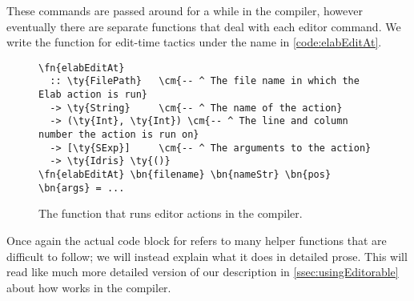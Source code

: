 These commands are passed around for a while in the compiler, however
eventually there are separate functions that deal with each editor command. We
write the function for edit-time tactics under the name  in
\autoref{code:elabEditAt}.

\begin{figure}[ht]
\caption{The function  that runs editor actions in the compiler.}
\label{code:elabEditAt}
\begin{Verbatim}[framesep=2mm, label=\footnotesize{\normalfont{Haskell}}, labelposition=topline]
\fn{elabEditAt}
  :: \ty{FilePath}   \cm{-- ^ The file name in which the Elab action is run}
  -> \ty{String}     \cm{-- ^ The name of the action}
  -> (\ty{Int}, \ty{Int}) \cm{-- ^ The line and column number the action is run on}
  -> [\ty{SExp}]     \cm{-- ^ The arguments to the action}
  -> \ty{Idris} \ty{()}
\fn{elabEditAt} \bn{filename} \bn{nameStr} \bn{pos} \bn{args} = ...
\end{Verbatim}
\end{figure}

Once again the actual code block for  refers to many helper
functions that are difficult to follow; we will instead explain what it does in
detailed prose. This will read like much more detailed version of our
description in \autoref{ssec:usingEditorable} about how  works
in the compiler.

